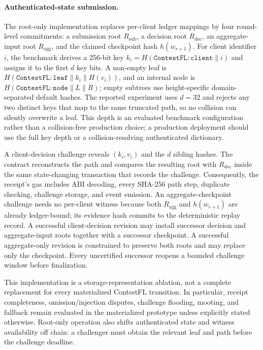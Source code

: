 \paragraph{Authenticated-state submission.}
The root-only implementation replaces per-client ledger mappings by four
round-level commitments: a submission root $R_{\mathrm{sub}}$, a decision root
$R_{\mathrm{dec}}$, an aggregate-input root $R_{\mathrm{agg}}$, and the claimed
checkpoint hash $h(w_{r+1})$.  For client identifier $i$, the benchmark derives
a 256-bit key $k_i=H(\mathtt{ContestFL:client}\parallel i)$ and assigns it to the
first $d$ key bits.  A non-empty leaf is
$H(\mathtt{ContestFL:leaf}\parallel k_i\parallel H(v_i))$, and an internal node
is $H(\mathtt{ContestFL:node}\parallel L\parallel R)$; empty subtrees use
height-specific domain-separated default hashes.  The reported experiment uses
$d=32$ and rejects any two distinct keys that map to the same truncated path,
so no collision can silently overwrite a leaf.  This depth is an evaluated
benchmark configuration rather than a collision-free production choice; a
production deployment should use the full key depth or a collision-resolving
authenticated dictionary.

A client-decision challenge reveals $(k_i,v_i)$ and the $d$ sibling hashes.  The
contract reconstructs the path and compares the resulting root with
$R_{\mathrm{dec}}$ inside the same state-changing transaction that records the
challenge.  Consequently, the receipt's gas includes ABI decoding, every
SHA-256 path step, duplicate checking, challenge storage, and event emission.
An aggregate-checkpoint challenge needs no per-client witness because both
$R_{\mathrm{agg}}$ and $h(w_{r+1})$ are already ledger-bound; its evidence hash
commits to the deterministic replay record.  A successful client-decision
revision may install successor decision and aggregate-input roots together with
a successor checkpoint.  A successful aggregate-only revision is constrained
to preserve both roots and may replace only the checkpoint.  Every uncertified
successor reopens a bounded challenge window before finalization.

This implementation is a storage-representation ablation, not a complete
replacement for every materialized ContestFL transition.  In particular,
receipt completeness, omission/injection disputes, challenge flooding,
mooting, and fallback remain evaluated in the materialized prototype unless
explicitly stated otherwise.  Root-only operation also shifts authenticated
state and witness availability off chain: a challenger must obtain the relevant
leaf and path before the challenge deadline.
